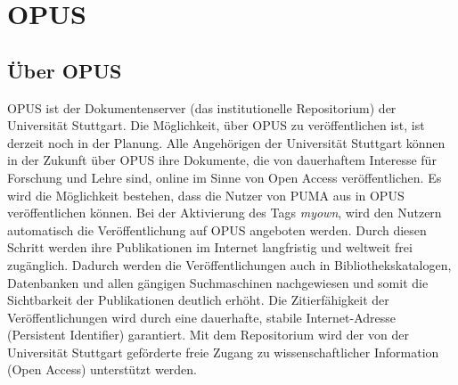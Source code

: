 \section{OPUS}
\subsection{Über OPUS}
OPUS ist der Dokumentenserver (das institutionelle Repositorium) der Universität Stuttgart. Die Möglichkeit, über OPUS zu veröffentlichen ist, ist derzeit noch in der Planung. Alle Angehörigen der Universität Stuttgart können in der Zukunft über OPUS ihre Dokumente, die von dauerhaftem Interesse für Forschung und Lehre sind, online im Sinne von Open Access veröffentlichen.
\newline\newline
Es wird die Möglichkeit bestehen, dass die Nutzer von PUMA aus in OPUS veröffentlichen können. Bei der Aktivierung des Tags \textit{myown}, wird den Nutzern automatisch die Veröffentlichung auf OPUS angeboten werden. Durch diesen Schritt werden ihre Publikationen im Internet langfristig und weltweit frei zugänglich. Dadurch werden die Veröffentlichungen auch in Bibliothekskatalogen, Datenbanken und allen gängigen Suchmaschinen nachgewiesen und somit die Sichtbarkeit der Publikationen deutlich erhöht.
\newline\newline
Die Zitierfähigkeit der Veröffentlichungen wird durch eine dauerhafte, stabile Internet-Adresse (Persistent Identifier) garantiert.
\newline\newline
Mit dem Repositorium wird der von der Universität Stuttgart geförderte freie Zugang zu wissenschaftlicher Information (Open Access) unterstützt werden.
